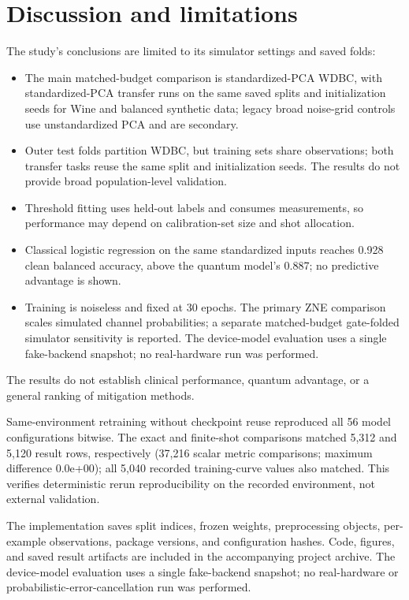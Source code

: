 \documentclass[conference]{IEEEtran}
\begin{document}
\section{Discussion and limitations}
The study's conclusions are limited to its simulator settings and saved folds:
\begin{itemize}
\item The main matched-budget comparison is standardized-PCA WDBC, with standardized-PCA transfer runs on the same saved splits and initialization seeds for Wine and balanced synthetic data; legacy broad noise-grid controls use unstandardized PCA and are secondary.
\item Outer test folds partition WDBC, but training sets share observations; both transfer tasks reuse the same split and initialization seeds. The results do not provide broad population-level validation.
\item Threshold fitting uses held-out labels and consumes measurements, so performance may depend on calibration-set size and shot allocation.
\item Classical logistic regression on the same standardized inputs reaches 0.928 clean balanced accuracy, above the quantum model's 0.887; no predictive advantage is shown.
\item Training is noiseless and fixed at 30 epochs. The primary ZNE comparison scales simulated channel probabilities; a separate matched-budget gate-folded simulator sensitivity is reported. The device-model evaluation uses a single fake-backend snapshot; no real-hardware run was performed.
\end{itemize}
The results do not establish clinical performance, quantum advantage, or a general ranking of mitigation methods.

Same-environment retraining without checkpoint reuse reproduced all 56 model configurations bitwise. The exact and finite-shot comparisons matched 5,312 and 5,120 result rows, respectively (37,216 scalar metric comparisons; maximum difference 0.0e+00); all 5,040 recorded training-curve values also matched. This verifies deterministic rerun reproducibility on the recorded environment, not external validation.

The implementation saves split indices, frozen weights, preprocessing objects, per-example observations, package versions, and configuration hashes. Code, figures, and saved result artifacts are included in the accompanying project archive. The device-model evaluation uses a single fake-backend snapshot; no real-hardware or probabilistic-error-cancellation run was performed.
\end{document}
